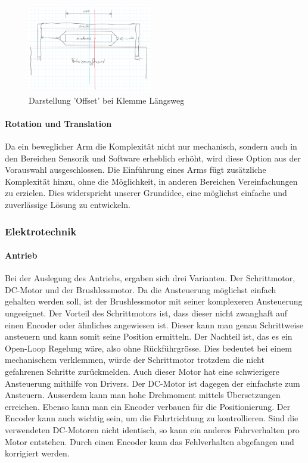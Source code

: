         \begin{figure}[h!]
            \centering
            \includegraphics[width=0.48\textwidth]{img/konzeptfindung/Klemme_Langsweg_off_center.png}
            \caption{Darstellung 'Offset' bei Klemme Längsweg}
        \label{img:konzept_zentrierung_3}
        \end{figure}  
                        
        \newpage         
        \paragraph{Rotation und Translation}
        Da ein beweglicher Arm die Komplexität nicht nur mechanisch, sondern auch in den Bereichen Sensorik und Software erheblich erhöht, wird diese Option aus der Vorauswahl ausgeschlossen. Die Einführung eines Arms fügt zusätzliche Komplexität hinzu, ohne die Möglichkeit, in anderen Bereichen Vereinfachungen zu erzielen. Dies widerspricht unserer Grundidee, eine möglichst einfache und zuverlässige Lösung zu entwickeln.

\subsubsection{Elektrotechnik}
    \paragraph{Antrieb}
    Bei der Auslegung des Antriebs, ergaben sich drei Varianten. Der Schrittmotor, DC-Motor und der Brushlessmotor. Da die Ansteuerung möglichst einfach gehalten werden soll, ist der Brushlessmotor mit seiner komplexeren Ansteuerung ungeeignet. Der Vorteil des Schrittmotors ist, dass dieser nicht zwanghaft auf einen Encoder oder ähnliches angewiesen ist. Dieser kann man genau Schrittweise ansteuern und kann somit seine Position ermitteln. Der Nachteil ist, das es ein Open-Loop Regelung wäre, also ohne Rückführgrösse. Dies bedeutet bei einem mechanischem verklemmen, würde der Schrittmotor trotzdem die nicht gefahrenen Schritte zurückmelden. Auch dieser Motor hat eine schwierigere Ansteuerung mithilfe von Drivers. Der DC-Motor ist dagegen der einfachste zum Ansteuern. Ausserdem kann man hohe Drehmoment mittels Übersetzungen erreichen. Ebenso kann man ein Encoder verbauen für die Positionierung. Der Encoder kann auch wichtig sein, um die Fahrtrichtung zu kontrollieren. Sind die verwendeten DC-Motoren nicht identisch, so kann ein anderes Fahrverhalten pro Motor entstehen. Durch einen Encoder kann das Fehlverhalten abgefangen und korrigiert werden.

